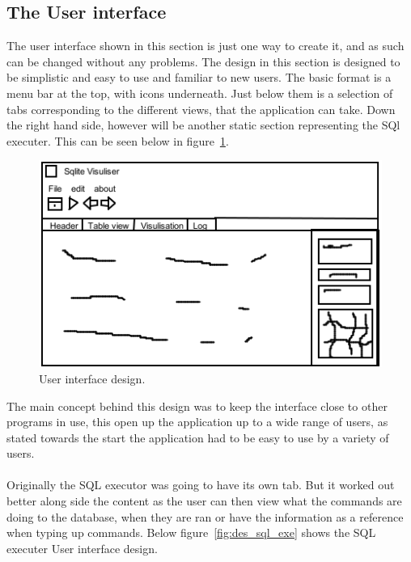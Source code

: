 \subsection{The User interface}
\label{subsec:high_user_interface}

The user interface shown in this section is just one way to create it, and as such can be changed without any problems. The design in this section is designed to be simplistic and easy to use and familiar to new users. The basic format is a menu bar at the top,  with icons underneath. Just below them is a selection of tabs corresponding to the different views, that the application can take. Down the right hand side, however will be another static section representing the SQl executer. This can be seen below in figure~\ref{fig:design_user_iterface}.

\begin{figure}[H]
	\centering
	\includegraphics[scale=0.55]{images/ui_design.png}
	\caption{User interface design.}
	\label{fig:design_user_iterface}
\end{figure}

The main concept behind this design was to keep the interface close to other programs in use, this open up the application up to a wide range of users, as stated towards the start the application had to be easy to use by a variety of users. 
\\\\
Originally the SQL executor was going to have its own tab. But it worked out better along side the content as the user can then view what the commands are doing to the database, when they are ran or have the information as a reference when typing up commands. Below figure~\ref{fig:des_sql_exe} shows the SQL executer User interface design.

